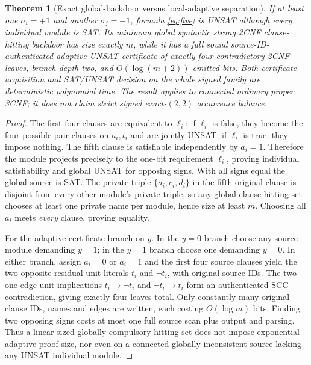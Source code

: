 \documentclass[11pt]{article}
\newtheorem{theorem}{Theorem}
\begin{document}
\begin{theorem}[Exact global-backdoor versus local-adaptive separation]\label{th:connected}
If at least one $\sigma_i=+1$ and another $\sigma_j=-1$, formula \eqref{eq:five} is UNSAT although every individual module is SAT. Its minimum \emph{global syntactic strong 2CNF clause-hitting backdoor} has size exactly $m$, while it has a full sound source-ID-authenticated adaptive UNSAT certificate of exactly four contradictory 2CNF leaves, branch depth two, and $O(\log(m+2))$ emitted bits. Both certificate acquisition and SAT/UNSAT decision on the \emph{whole signed family} are deterministic polynomial time. The result applies to connected ordinary proper 3CNF; it does \emph{not} claim strict signed exact-$(2,2)$ occurrence balance.
\end{theorem}
\begin{proof}
The first four clauses are equivalent to $\ell_i$: if $\ell_i$ is false, they become the four possible pair clauses on $a_i,t_i$ and are jointly UNSAT; if $\ell_i$ is true, they impose nothing. The fifth clause is satisfiable independently by $a_i=1$. Therefore the module projects precisely to the one-bit requirement $\ell_i$, proving individual satisfiability and global UNSAT for opposing signs. With all signs equal the global source is SAT. The private triple $\{a_i,c_i,d_i\}$ in the fifth original clause is disjoint from every other module's private triple, so any global clause-hitting set chooses at least one private name per module, hence size at least $m$. Choosing all $a_i$ meets \emph{every} clause, proving equality.

For the adaptive certificate branch on $y$. In the $y=0$ branch choose any source module demanding $y=1$; in the $y=1$ branch choose one demanding $y=0$. In either branch, assign $a_i=0$ or $a_i=1$ and the first four source clauses yield the two opposite residual unit literals $t_i$ and $\neg t_i$, with original source IDs. The two one-edge unit implications $t_i\to\neg t_i$ and $\neg t_i\to t_i$ form an authenticated SCC contradiction, giving exactly four leaves total. Only constantly many original clause IDs, names and edges are written, each costing $O(\log m)$ bits. Finding two opposing signs costs at most one full source scan plus output and parsing. Thus a linear-sized globally compulsory hitting set does not impose exponential adaptive proof size, nor even on a connected globally inconsistent source lacking any UNSAT individual module.\end{proof}
\end{document}
